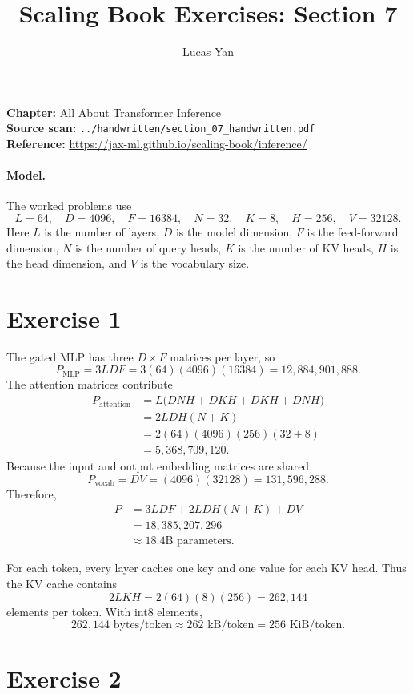 \documentclass[11pt]{article}
\title{Scaling Book Exercises: Section 7}
\author{Lucas Yan}
\date{}
\begin{document}
\maketitle

\noindent
\textbf{Chapter:} All About Transformer Inference\\
\textbf{Source scan:} \texttt{../handwritten/section\_07\_handwritten.pdf}\\
\textbf{Reference:} \url{https://jax-ml.github.io/scaling-book/inference/}

\paragraph{Model.}
The worked problems use
\[
L=64,\quad D=4096,\quad F=16384,\quad N=32,\quad
K=8,\quad H=256,\quad V=32128.
\]
Here $L$ is the number of layers, $D$ is the model dimension, $F$ is the
feed-forward dimension, $N$ is the number of query heads, $K$ is the number
of KV heads, $H$ is the head dimension, and $V$ is the vocabulary size.

\section*{Exercise 1}

The gated MLP has three $D\times F$ matrices per layer, so
\[
P_{\mathrm{MLP}}=3LDF
=3(64)(4096)(16384)
=12{,}884{,}901{,}888.
\]
The attention matrices contribute
\begin{align*}
P_{\mathrm{attention}}
&=L\bigl(DNH+DKH+DKH+DNH\bigr)\\
&=2LDH(N+K)\\
&=2(64)(4096)(256)(32+8)\\
&=5{,}368{,}709{,}120.
\end{align*}
Because the input and output embedding matrices are shared,
\[
P_{\mathrm{vocab}}=DV=(4096)(32128)=131{,}596{,}288.
\]
Therefore,
\begin{align*}
P
&=3LDF+2LDH(N+K)+DV\\
&=18{,}385{,}207{,}296\\
&\approx\boxed{18.4\text{B parameters}}.
\end{align*}

For each token, every layer caches one key and one value for each KV head.
Thus the KV cache contains
\[
2LKH=2(64)(8)(256)=262{,}144
\]
elements per token. With int8 elements,
\[
\boxed{262{,}144\text{ bytes/token}
\approx262\text{ kB/token}=256\text{ KiB/token}}.
\]

\section*{Exercise 2}
\end{document}
